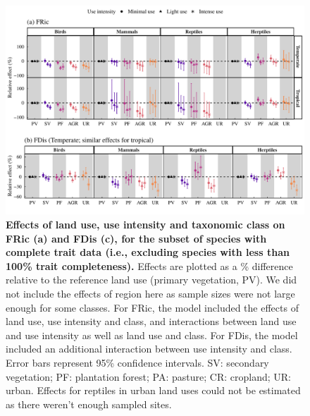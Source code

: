 \begin{figure}[h!]
\centering
\includegraphics[scale=0.7]{Supporting/Chapter3/Figures/SI_Figure22}
\caption[Effects of land use, use intensity and taxonomic class on FRic (a) and FDis (c), for the subset of species with complete trait data]{\textbf{Effects of land use, use intensity and taxonomic class on FRic (a) and FDis (c), for the subset of species with complete trait data (i.e., excluding species with less than 100\% trait completeness).} Effects are plotted as a \% difference relative to the reference land use (primary vegetation, PV). We did not include the effects of region here as sample sizes were not large enough for some classes. For FRic, the model included the effects of land use, use intensity and class, and interactions between land use and use intensity as well as land use and class. For FDis, the model included an additional interaction between use intensity and class. Error bars represent 95\% confidence intervals. SV: secondary vegetation; PF: plantation forest; PA: pasture; CR: cropland; UR: urban. Effects for reptiles in urban land uses could not be estimated as there weren’t enough sampled sites.}
\label{}
\end{figure}


